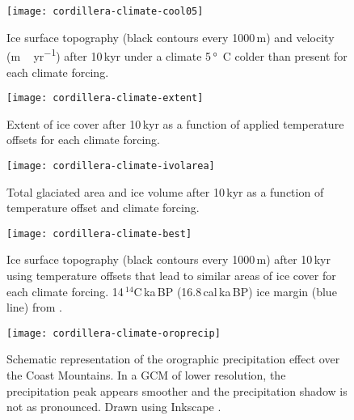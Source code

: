 \begin{figure*}[t]
	\vspace*{2mm}
	\begin{center}
		\texttt{[image: cordillera-climate-cool05]}
	\end{center}
	\caption{Ice surface topography (black contours every 1000\,m) and velocity (\unit{m\,yr^{-1}}) after 10\,kyr under a climate 5\,\unit{\degree C} colder than present for each climate forcing.}
	\label{fig:cool05}
\end{figure*}

\begin{figure*}[t]
	\vspace*{2mm}
	\begin{center}
		\texttt{[image: cordillera-climate-extent]}
	\end{center}
	\caption{Extent of ice cover after 10\,kyr as a function of applied temperature offsets for each climate forcing.}
	\label{fig:extent}
\end{figure*}

\begin{figure}[t]
	\vspace*{2mm}
	\begin{center}
		\texttt{[image: cordillera-climate-ivolarea]}
	\end{center}
	\caption{Total glaciated area and ice volume after 10\,kyr as a function of temperature offset and climate forcing.}
	\label{fig:ivolarea}
\end{figure}

\begin{figure*}[t]
	\vspace*{2mm}
	\begin{center}
		\texttt{[image: cordillera-climate-best]}
	\end{center}
	\caption{Ice surface topography (black contours every 1000\,m) after 10\,kyr using temperature offsets that lead to similar areas of ice cover for each climate forcing. 14\,$^{14}$C\,ka\,BP (16.8\,cal\,ka\,BP) ice margin (blue line) from \citet{dyke-2004}.}
	\label{fig:best}
\end{figure*}

\begin{figure}[t]
	\vspace*{2mm}
	\begin{center}
		\texttt{[image: cordillera-climate-oroprecip]}
	\end{center}
	\caption{Schematic representation of the orographic precipitation effect over the Coast Mountains. In a GCM of lower resolution, the precipitation peak appears smoother and the precipitation shadow is not as pronounced. Drawn using Inkscape \citep{web:inkscape}.}
	\label{fig:oroprecip}
\end{figure}
